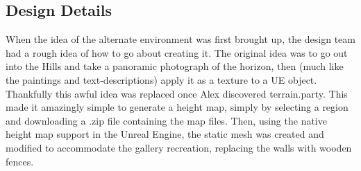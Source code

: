 \subsection{Design Details}
When the idea of the alternate environment was first brought up, the design team had a rough idea of how to go about creating it.  The original idea was to go out into the Hills and take a panoramic photograph of the horizon, then (much like the paintings and text-descriptions) apply it as a texture to a UE object.  Thankfully this awful idea was replaced once Alex discovered terrain.party.  This made it amazingly simple to generate a height map, simply by selecting a region and downloading a .zip file containing the map files.  Then, using the native height map support in the Unreal Engine, the static mesh was created and modified to accommodate the gallery recreation, replacing the walls with wooden fences.


